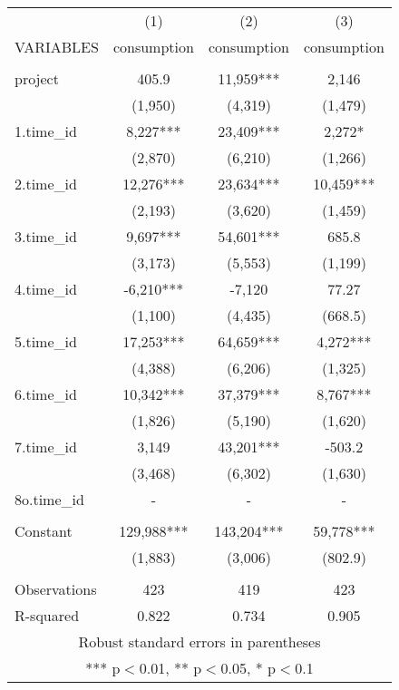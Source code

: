 \documentclass[]{article}
\begin{document}
\begin{tabular}{lccc} \hline
 & (1) & (2) & (3) \\
VARIABLES & consumption & consumption & consumption \\ \hline
 &  &  &  \\
project & 405.9 & 11,959*** & 2,146 \\
 & (1,950) & (4,319) & (1,479) \\
1.time\_id & 8,227*** & 23,409*** & 2,272* \\
 & (2,870) & (6,210) & (1,266) \\
2.time\_id & 12,276*** & 23,634*** & 10,459*** \\
 & (2,193) & (3,620) & (1,459) \\
3.time\_id & 9,697*** & 54,601*** & 685.8 \\
 & (3,173) & (5,553) & (1,199) \\
4.time\_id & -6,210*** & -7,120 & 77.27 \\
 & (1,100) & (4,435) & (668.5) \\
5.time\_id & 17,253*** & 64,659*** & 4,272*** \\
 & (4,388) & (6,206) & (1,325) \\
6.time\_id & 10,342*** & 37,379*** & 8,767*** \\
 & (1,826) & (5,190) & (1,620) \\
7.time\_id & 3,149 & 43,201*** & -503.2 \\
 & (3,468) & (6,302) & (1,630) \\
8o.time\_id & - & - & - \\
 &  &  &  \\
Constant & 129,988*** & 143,204*** & 59,778*** \\
 & (1,883) & (3,006) & (802.9) \\
 &  &  &  \\
Observations & 423 & 419 & 423 \\
 R-squared & 0.822 & 0.734 & 0.905 \\ \hline
\multicolumn{4}{c}{ Robust standard errors in parentheses} \\
\multicolumn{4}{c}{ *** p$<$0.01, ** p$<$0.05, * p$<$0.1} \\
\end{tabular}
\end{document}
